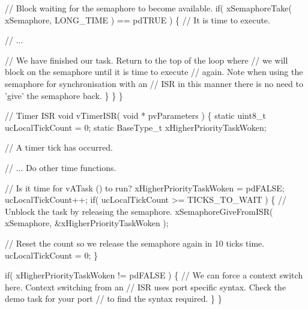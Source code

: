 \begin{DoxyPre}       // Block waiting for the semaphore to become available.
       if( xSemaphoreTake( xSemaphore, LONG\_TIME ) == pdTRUE )
       \{
           // It is time to execute.\end{DoxyPre}



\begin{DoxyPre}           // ...\end{DoxyPre}



\begin{DoxyPre}           // We have finished our task.  Return to the top of the loop where
           // we will block on the semaphore until it is time to execute
           // again.  Note when using the semaphore for synchronisation with an
        // ISR in this manner there is no need to 'give' the semaphore back.
       \}
   \}
\}\end{DoxyPre}



\begin{DoxyPre}// Timer ISR
void vTimerISR( void * pvParameters )
\{
static uint8\_t ucLocalTickCount = 0;
static BaseType\_t xHigherPriorityTaskWoken;\end{DoxyPre}



\begin{DoxyPre}   // A timer tick has occurred.\end{DoxyPre}



\begin{DoxyPre}   // ... Do other time functions.\end{DoxyPre}



\begin{DoxyPre}   // Is it time for vATask () to run?
   xHigherPriorityTaskWoken = pdFALSE;
   ucLocalTickCount++;
   if( ucLocalTickCount >= TICKS\_TO\_WAIT )
   \{
       // Unblock the task by releasing the semaphore.
       xSemaphoreGiveFromISR( xSemaphore, \&xHigherPriorityTaskWoken );\end{DoxyPre}



\begin{DoxyPre}       // Reset the count so we release the semaphore again in 10 ticks time.
       ucLocalTickCount = 0;
   \}\end{DoxyPre}



\begin{DoxyPre}   if( xHigherPriorityTaskWoken != pdFALSE )
   \{
       // We can force a context switch here.  Context switching from an
       // ISR uses port specific syntax.  Check the demo task for your port
       // to find the syntax required.
   \}
\}
\end{DoxyPre}
 